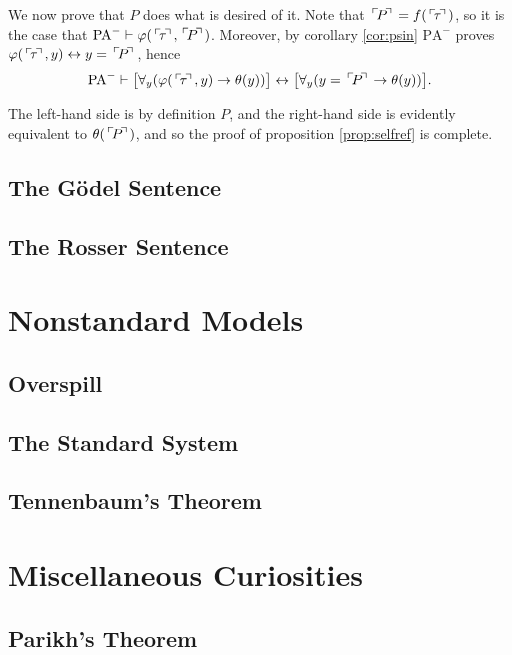 \documentclass{article}
\theoremstyle{nonumberplain}
\newcommand{\PA}{\mathrm{PA}}
\newcommand{\WPA}{\PA^-}
\newcommand{\gn}[1]{\setbox0=\hbox{$\mathclap{\phantom{t}}#1$} \dimen0=\ht0 \advance\dimen0 by -1.25ex \,\raise\dimen0\hbox{$\ulcorner$} \! \box0 \! \raise\dimen0\hbox{$\urcorner$}\,}
\begin{document}
We now prove that $P$ does what is desired of it. Note that $\gn P = f(\gn \tau)$, so it is the case that $\WPA \vdash \varphi(\gn\tau, \gn P)$. Moreover, by corollary \ref{cor:psin} $\WPA$ proves $\varphi(\gn\tau, y) \leftrightarrow y=\gn P$, hence
\begin{equation}
\WPA \vdash \big[ \forall_y(\varphi(\gn \tau,y) \rightarrow \theta(y)) \big] \leftrightarrow \big[ \forall_y (y = \gn P \rightarrow \theta(y)) \big].
\end{equation}

The left-hand side is by definition $P$, and the right-hand side is evidently equivalent to $\theta(\gn P)$, and so the proof of proposition \ref{prop:selfref} is complete.



\subsection{The Gödel Sentence}

\subsection{The Rosser Sentence}

\section{Nonstandard Models}

\subsection{Overspill}

\subsection{The Standard System}

\subsection{Tennenbaum's Theorem}

\section{Miscellaneous Curiosities}

\subsection{Parikh's Theorem}

%
%
\end{document}
